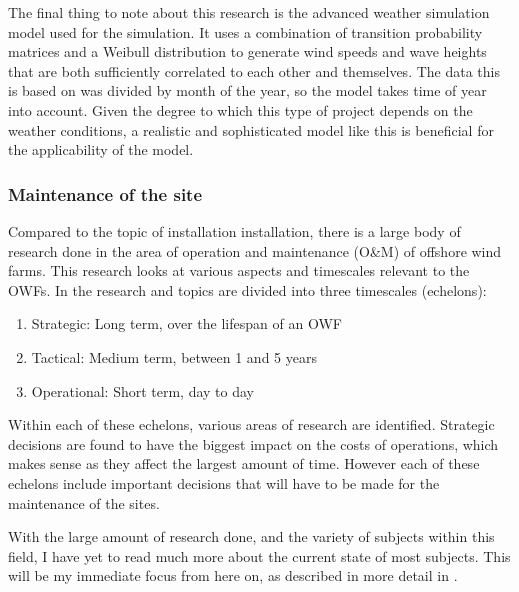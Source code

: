 \documentclass[a4paper,12pt]{article}
\begin{document}
The final thing to note about this research is the advanced weather simulation model used for the simulation. It uses a combination of transition probability matrices and a Weibull distribution to generate wind speeds and wave heights that are both sufficiently correlated to each other and themselves. The data this is based on was divided by month of the year, so the model takes time of year into account. Given the degree to which this type of project depends on the weather conditions, a realistic and sophisticated model like this is beneficial for the applicability of the model. 

\subsubsection{Maintenance of the site} \label{sss:maint}

Compared to the topic of installation installation, there is a large body of research done in the area of operation and maintenance (O\&M) of offshore wind farms. This research looks at various aspects and timescales relevant to the OWFs. In \cite{shafiee2015maintenance} the research and topics are divided into three timescales (echelons):

\begin{enumerate}
\item Strategic: Long term, over the lifespan of an OWF
\item Tactical: Medium term, between 1 and 5 years
\item Operational: Short term, day to day
\end{enumerate}

Within each of these echelons, various areas of research are identified. Strategic decisions are found to have the biggest impact on the costs of operations, which makes sense as they affect the largest amount of time. However each of these echelons include important decisions that will have to be made for the maintenance of the sites. 

With the large amount of research done, and the variety of subjects within this field, I have yet to read much more about the current state of most subjects. This will be my immediate focus from here on, as described in more detail in .
\end{document}
